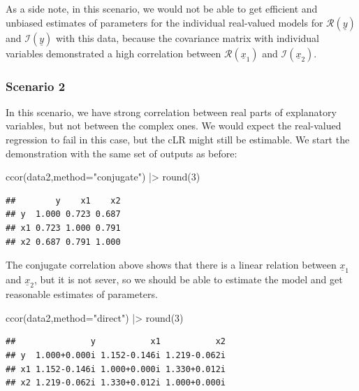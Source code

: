\documentclass[
]{book}
\newenvironment{Shaded}{\begin{snugshade}}{\end{snugshade}}
\newcommand{\AttributeTok}[1]{\textcolor[rgb]{0.77,0.63,0.00}{#1}}
\newcommand{\DecValTok}[1]{\textcolor[rgb]{0.00,0.00,0.81}{#1}}
\newcommand{\FunctionTok}[1]{\textcolor[rgb]{0.00,0.00,0.00}{#1}}
\newcommand{\NormalTok}[1]{#1}
\newcommand{\SpecialCharTok}[1]{\textcolor[rgb]{0.00,0.00,0.00}{#1}}
\newcommand{\StringTok}[1]{\textcolor[rgb]{0.31,0.60,0.02}{#1}}
\begin{document}
As a side note, in this scenario, we would not be able to get efficient and unbiased estimates of parameters for the individual real-valued models for \(\mathcal{R}\left(\underline{y}\right)\) and \(\mathcal{I}\left(\underline{y}\right)\) with this data, because the covariance matrix with individual variables demonstrated a high correlation between \(\mathcal{R}\left(\underline{x}_1\right)\) and \(\mathcal{I}\left(\underline{x}_2\right)\).

\hypertarget{scenario-2}{%
\subsubsection*{Scenario 2}\label{scenario-2}}

In this scenario, we have strong correlation between real parts of explanatory variables, but not between the complex ones. We would expect the real-valued regression to fail in this case, but the cLR might still be estimable. We start the demonstration with the same set of outputs as before:

\begin{Shaded}
\begin{Highlighting}[]
\FunctionTok{ccor}\NormalTok{(data2,}\AttributeTok{method=}\StringTok{"conjugate"}\NormalTok{) }\SpecialCharTok{|\textgreater{}} \FunctionTok{round}\NormalTok{(}\DecValTok{3}\NormalTok{)}
\end{Highlighting}
\end{Shaded}

\begin{verbatim}
##        y    x1    x2
## y  1.000 0.723 0.687
## x1 0.723 1.000 0.791
## x2 0.687 0.791 1.000
\end{verbatim}

The conjugate correlation above shows that there is a linear relation between \(\underline{x}_{1}\) and \(\underline{x}_{2}\), but it is not sever, so we should be able to estimate the model and get reasonable estimates of parameters.

\begin{Shaded}
\begin{Highlighting}[]
\FunctionTok{ccor}\NormalTok{(data2,}\AttributeTok{method=}\StringTok{"direct"}\NormalTok{) }\SpecialCharTok{|\textgreater{}} \FunctionTok{round}\NormalTok{(}\DecValTok{3}\NormalTok{)}
\end{Highlighting}
\end{Shaded}

\begin{verbatim}
##               y           x1           x2
## y  1.000+0.000i 1.152-0.146i 1.219-0.062i
## x1 1.152-0.146i 1.000+0.000i 1.330+0.012i
## x2 1.219-0.062i 1.330+0.012i 1.000+0.000i
\end{verbatim}
\end{document}
